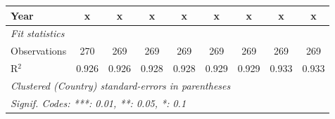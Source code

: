 \begin{table}[htbp]
\begin{tabular}{lcccccccc}
      Year                                      & x              & x              & x             & x             & x              & x              & x              & x\\  
      \midrule \emph{Fit statistics}\\
      Observations                              & 270            & 269            & 269           & 269           & 269            & 269            & 269            & 269\\  
      R$^2$                                     & 0.926          & 0.926          & 0.928         & 0.928         & 0.929          & 0.929          & 0.933          & 0.933\\  
      \midrule
      \multicolumn{9}{l}{\emph{Clustered (Country) standard-errors in parentheses}}\\
      \multicolumn{9}{l}{\emph{Signif. Codes: ***: 0.01, **: 0.05, *: 0.1}}\\
   \end{tabular}
\end{table}


